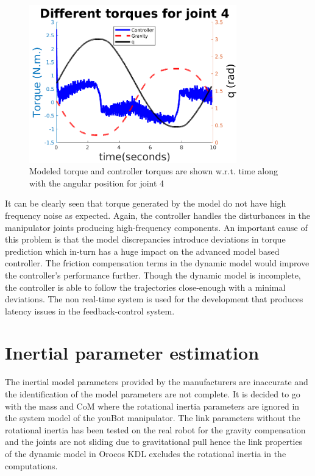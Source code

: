 \begin{figure}[H]
\centering
\includegraphics[width=90mm, trim=0 0 0 0]{pictures/joint4_ratio}
\caption{Modeled torque and controller torques are shown w.r.t. time along with the angular position for joint 4}
\label{fig:ratiojoint4}
\end{figure}

It can be clearly seen that torque generated by the model do not have high frequency noise as expected. Again, the controller handles the disturbances in the manipulator joints producing high-frequency components. An important cause of this problem is that the model discrepancies introduce deviations in torque prediction which in-turn has a huge impact on the advanced model based controller. The friction compensation terms in the dynamic model would improve the controller's performance further. Though the dynamic model is incomplete, the controller is able to follow the trajectories close-enough with a minimal deviations. The non real-time system is used for the development that produces latency issues in the feedback-control system. 

\section{Inertial parameter estimation}

The inertial model parameters provided by the manufacturers are inaccurate and the identification of the model parameters are not complete. It is decided to go with the mass and CoM where the rotational inertia parameters are ignored in the system model of the youBot manipulator. The link parameters without the rotational inertia has been tested on the real robot for the gravity compensation and the joints are not sliding due to gravitational pull hence the link properties of the dynamic model in Orocos KDL excludes the rotational inertia in the computations.